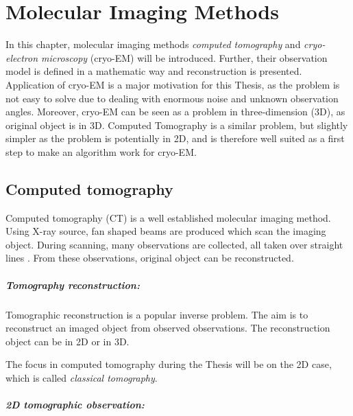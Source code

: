 \chapter{Molecular Imaging Methods}
\label{sec:imaging}

In this chapter, molecular imaging methods \textit{computed tomography} and 
\textit{cryo-electron microscopy} (cryo-EM) will be introduced. 
Further, their observation model is defined in a mathematic way and reconstruction is presented.
Application of cryo-EM is a major motivation for this Thesis, 
as the problem is not easy to solve due to dealing with enormous noise and unknown observation angles.
Moreover, cryo-EM can be seen as a problem in three-dimension (3D), as original object is in 3D.
Computed Tomography is a similar problem, but slightly simpler as the problem is potentially in 2D, and is therefore well suited as a
first step to make an algorithm work for cryo-EM. 


\section{Computed tomography}
Computed tomography (CT) is a well established molecular imaging method.
Using X-ray source, fan shaped beams are produced which scan the imaging object.
During scanning, many observations are collected, all taken over straight lines \cite{computedTomography}.
From these observations, original object can be reconstructed.

\paragraph{Tomography reconstruction:}
Tomographic reconstruction \cite{tomographicReconstruction} is a popular inverse problem. 
The aim is to reconstruct an imaged object from observed observations.
The reconstruction object can be in 2D or in 3D. 

\begin{tcolorbox}[colback=red!5!white,colframe=red!75!black]
    The focus in computed tomography during the Thesis will be on the 2D case, which is called \textit{classical tomography}.
\end{tcolorbox}

\pagebreak

\paragraph{2D tomographic observation:}

